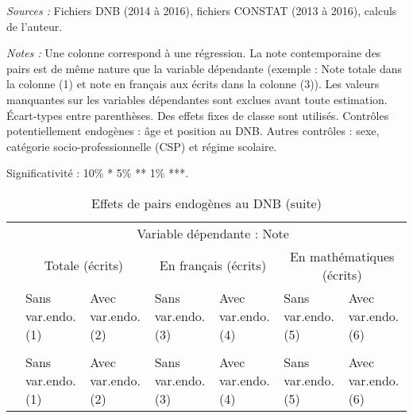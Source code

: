 \documentclass[
]{book}
\begin{document}
\begingroup\fontsize{6}{8}\selectfont

\begin{ThreePartTable}
\begin{TableNotes}
\item \textit{Sources :} Fichiers DNB (2014 à 2016), fichiers CONSTAT (2013 à 2016), calculs de l'auteur.
\item \textit{Notes :} Une colonne correspond à une régression. La note contemporaine des pairs est de même nature que la variable dépendante (exemple : Note totale dans la colonne (1) et note en français aux écrits dans la colonne (3)). Les valeurs manquantes sur les variables dépendantes sont exclues avant toute estimation. Écart-types entre parenthèses. Des effets fixes de classe sont utilisés. Contrôles potentiellement endogènes : âge et position au DNB. Autres contrôles : sexe, catégorie socio-professionnelle (CSP) et régime scolaire.
\item Significativité : 10\% * 5\% ** 1\% ***.
\end{TableNotes}
\begin{longtable}[t]{lllllll}
\caption{\label{tab:pepcmlmodels}Effets de pairs endogènes au DNB}\\
\toprule
\multicolumn{1}{c}{} & \multicolumn{6}{c}{Variable dépendante : Note} \\
\cmidrule(l{3pt}r{3pt}){2-7}
\multicolumn{1}{c}{} & \multicolumn{2}{c}{Totale (écrits)} & \multicolumn{2}{c}{En français (écrits)} & \multicolumn{2}{c}{En mathématiques (écrits)} \\
\cmidrule(l{3pt}r{3pt}){2-3} \cmidrule(l{3pt}r{3pt}){4-5} \cmidrule(l{3pt}r{3pt}){6-7}
 & \makecell{Sans var.endo. \\ (1) } & \makecell{Avec var.endo. \\ (2) } & \makecell{Sans var.endo. \\ (3) } & \makecell{Avec var.endo. \\ (4) } & \makecell{Sans var.endo. \\ (5) } & \makecell{Avec var.endo. \\ (6) }\\
\midrule
\endfirsthead
\caption[]{\label{tab:pepcmlmodels}Effets de pairs endogènes au DNB (suite)}\\
\toprule
 & \makecell{Sans var.endo. \\ (1) } & \makecell{Avec var.endo. \\ (2) } & \makecell{Sans var.endo. \\ (3) } & \makecell{Avec var.endo. \\ (4) } & \makecell{Sans var.endo. \\ (5) } & \makecell{Avec var.endo. \\ (6) }\\
\midrule
\endhead


\end{longtable}
\end{ThreePartTable}
\end{document}
